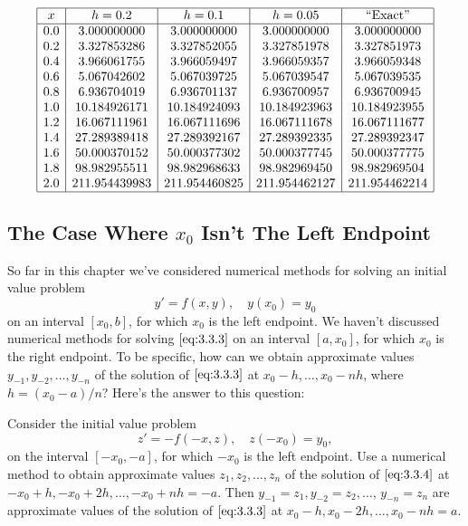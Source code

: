 \documentclass{ximera}
\begin{document}
\begin{example}
$$
\begin{array}{|c|c|c|c|c|}
\hline
x&
h=0.2&
h=0.1&
h=0.05&
\text{``Exact''}\\ \hline
0.0 &   3.000000000 &   3.000000000 &   3.000000000 &   3.000000000 \\
0.2 &   3.327853286 &   3.327852055 &   3.327851978 &   3.327851973 \\
0.4 &   3.966061755 &   3.966059497 &   3.966059357 &   3.966059348 \\
0.6 &   5.067042602 &   5.067039725 &   5.067039547 &   5.067039535 \\
0.8 &   6.936704019 &   6.936701137 &   6.936700957 &   6.936700945 \\
1.0 &  10.184926171 &  10.184924093 &  10.184923963 &  10.184923955 \\
1.2 &  16.067111961 &  16.067111696 &  16.067111678 &  16.067111677 \\
1.4 &  27.289389418 &  27.289392167 &  27.289392335 &  27.289392347 \\
1.6 &  50.000370152 &  50.000377302 &  50.000377745 &  50.000377775 \\
1.8 &  98.982955511 &  98.982968633 &  98.982969450 &  98.982969504 \\
2.0 & 211.954439983 & 211.954460825 & 211.954462127 & 211.954462214 \\
\hline
\end{array}
$$
\end{example}


\subsection*{The Case Where $x_0$ Isn't  The Left Endpoint}

So far in this chapter we've considered numerical methods
 for solving an initial value problem
\begin{equation} \label{eq:3.3.3}
y'=f(x,y),\quad y(x_0)=y_0
\end{equation}
on an interval $[x_0,b]$, for which $x_0$ is the left endpoint. We
haven't discussed numerical methods for solving $\eqref{eq:3.3.3}$
on an interval $[a,x_0]$, for which $x_0$ is the
right endpoint. To be specific, how can we obtain approximate values
$y_{-1}, y_{-2}, \dots, y_{-n}$ of the solution of $\eqref{eq:3.3.3}$ at
$x_0-h, \dots,x_0-nh$,
where $h=(x_0-a)/n$?  Here's the answer to this question:

 Consider the initial value problem
\begin{equation} \label{eq:3.3.4}
z'=-f(-x,z),\quad z(-x_0)=y_0,
\end{equation}
on the interval $[-x_0,-a]$, for which $-x_0$ is the left endpoint.
Use a numerical method to obtain approximate values
$z_1, z_2, \dots, z_n$ of the solution of $\eqref{eq:3.3.4}$ at
$-x_0+h, -x_0+2h, \dots, -x_0+nh=-a$. Then
$y_{-1}=z_1, y_{-2}=z_2, \dots$, $y_{-n}=z_n$
are approximate values of the solution of $\eqref{eq:3.3.3}$ at
$x_0-h, x_0-2h, \dots, x_0-nh=a$.
\end{document}
